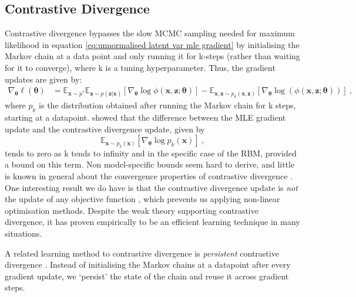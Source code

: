 \documentclass[11pt, oneside]{article}
\newcommand{\thetab}{{\boldsymbol{\theta}}}
\newcommand{\pnn}{\phi}
\newcommand{\gradtheta}{\nabla_{\thetab}}
\newcommand{\x}{{\mathbf x}}
\newcommand{\z}{{\mathbf z}}
\newcommand{\E}{\mathbb{E}}
\newcommand{\Edata}{\E_{\x \sim p^*}}
\theoremstyle{definition}
\begin{document}
\subsection{Contrastive Divergence}
\label{sec:cd}
Contrastive divergence \citep{hinton2006training} bypasses the slow MCMC sampling needed for maximum likelihood in equation \ref{eq:unnormalised latent var mle gradient} by initialising the Markov chain at a data point and only running it for k-steps (rather than waiting for it to converge), where k is a tuning hyperparameter. Thus, the gradient updates are given by:
\begin{align}
    \label{eq:cd grad update}
    \nabla_{\thetab} \ell(\thetab) &= \Edata \E_{\z \sim p(\z | \x)} \left[ \nabla_{\thetab} \log \pnn(\x, \z;\thetab) \right] - \E_{\x, \z \sim p_k(\x, \z)} \left[\nabla_{\thetab} \log \left(\pnn(\x, \z;\thetab) \right) \right] \ , 
\end{align}
where $p_k$ is the distribution obtained after running the Markov chain for k steps, starting at a datapoint. \citet{bengio2009justifying} showed that the difference between the MLE gradient update and the contrastive divergence update, given by 
\begin{equation}
    \label{eq:cd bias}
    \E_{\x \sim p_k(\x)} \left[ \gradtheta \log p_k(\x) \right] \ ,
\end{equation}
tends to zero as k tends to infinity and in the specific case of the RBM, provided a bound on this term. Non model-specific bounds seem hard to derive, and little is known in general about the convergence properties of contrastive divergence \citep{carreira2005contrastive}. One interesting result we do have is that the contrastive divergence update is \emph{not} the update of any objective function \citep{sutskever2010convergence}, which prevents us applying non-linear optimisation methods. Despite the weak theory supporting contrastive divergence, it has proven empirically to be an efficient learning technique in many situations.

A related learning method to contrastive divergence is  \emph{persistent} contrastive divergence \citep{younes1998stochastic, tieleman2009using}. Instead of initialising the Markov chains at a datapoint after every gradient update, we `persist' the state of the chain and reuse it across gradient steps. 

\end{document}
